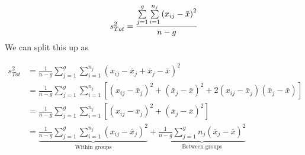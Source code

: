 \documentclass[
  openany]{book}
\theoremstyle{definition}
\theoremstyle{definition}
\theoremstyle{definition}
\theoremstyle{definition}
\theoremstyle{remark}
\begin{document}
\[
s^2_{Tot} =  \frac{\sum\limits_{j=1}^g \sum\limits_{i=1}^{n_j}\left(x_{ij}-\bar{x}\right)^2}{n-g}\\
\]
We can split this up as

\[
\begin{aligned}
s^2_{Tot} & = \frac{1}{n-g}\sum\limits_{j=1}^g \sum\limits_{i=1}^{n_j}\left(x_{ij} - \bar{x}_j + \bar{x}_j-\bar{x}\right)^2\\
& = \frac{1}{n-g}\sum\limits_{j=1}^g \sum\limits_{i=1}^{n_j}\left[\left(x_{ij} - \bar{x}_j\right)^2 + \left(\bar{x}_j-\bar{x}\right)^2 + 2\left(x_{ij} - \bar{x}_j\right)\left(\bar{x}_j-\bar{x}\right)\right]\\
& = \frac{1}{n-g}\sum\limits_{j=1}^g \sum\limits_{i=1}^{n_j}\left[\left(x_{ij} - \bar{x}_j\right)^2 + \left(\bar{x}_j-\bar{x}\right)^2 \right]\\
&= \underbrace{\frac{1}{n-g}\sum\limits_{j=1}^g \sum\limits_{i=1}^{n_j}\left(x_{ij} - \bar{x}_j\right)^2}_{\text{Within groups}} + \underbrace{\frac{1}{n-g}\sum\limits_{j=1}^g n_j\left(\bar{x}_j - \bar{x}\right)^2}_{\text{Between groups}}
\end{aligned}
\]
\end{document}
